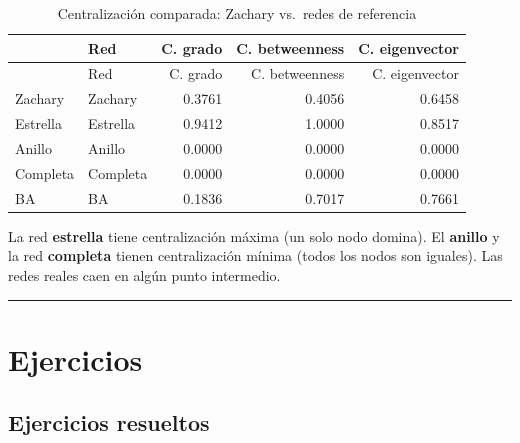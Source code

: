 \documentclass[
  letterpaper,
  DIV=11,
  numbers=noendperiod]{scrreprt}
\begin{document}
\begin{longtable}[]{@{}llrrr@{}}
\caption{Centralización comparada: Zachary vs.~redes de
referencia}\tabularnewline
\toprule\noalign{}
& Red & C. grado & C. betweenness & C. eigenvector \\
\midrule\noalign{}
\endfirsthead
\toprule\noalign{}
& Red & C. grado & C. betweenness & C. eigenvector \\
\midrule\noalign{}
\endhead
\bottomrule\noalign{}
\endlastfoot
Zachary & Zachary & 0.3761 & 0.4056 & 0.6458 \\
Estrella & Estrella & 0.9412 & 1.0000 & 0.8517 \\
Anillo & Anillo & 0.0000 & 0.0000 & 0.0000 \\
Completa & Completa & 0.0000 & 0.0000 & 0.0000 \\
BA & BA & 0.1836 & 0.7017 & 0.7661 \\
\end{longtable}

\begin{tcolorbox}[enhanced jigsaw, toprule=.15mm, colframe=quarto-callout-important-color-frame, coltitle=black, titlerule=0mm, colback=white, breakable, leftrule=.75mm, arc=.35mm, bottomtitle=1mm, toptitle=1mm, rightrule=.15mm, bottomrule=.15mm, left=2mm, title=\textcolor{quarto-callout-important-color}{\faExclamation}\hspace{0.5em}{🔑 Recuerda}, colbacktitle=quarto-callout-important-color!10!white, opacityback=0, opacitybacktitle=0.6]

La red \textbf{estrella} tiene centralización máxima (un solo nodo
domina). El \textbf{anillo} y la red \textbf{completa} tienen
centralización mínima (todos los nodos son iguales). Las redes reales
caen en algún punto intermedio.

\end{tcolorbox}

\begin{center}\rule{0.5\linewidth}{0.5pt}\end{center}

\section{Ejercicios}\label{ejercicios-5}

\subsection*{Ejercicios resueltos}\label{ejercicios-resueltos-5}
\end{document}
